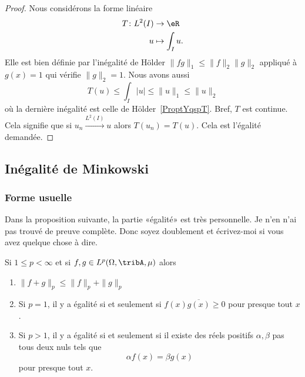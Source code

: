 \begin{proof}
	Nous considérons la forme linéaire
	\begin{equation}
		\begin{aligned}
			T\colon L^2(I) & \to \eR           \\
			u              & \mapsto \int_Iu .
		\end{aligned}
	\end{equation}
	Elle est bien définie par l'inégalité de Hölder \( \| fg \|_1\leq \| f \|_2\| g \|_2\) appliqué à \( g(x)=1\) qui vérifie \( \| g \|_2=1\). Nous avons aussi
	\begin{equation}
		T(u)\leq \int_I| u |\leq \| u \|_1\leq\| u \|_2
	\end{equation}
	où la dernière inégalité est celle de Hölder~\ref{ProptYqspT}. Bref, \( T\) est continue. Cela signifie que si \( u_n\stackrel{L^2(I)}{\longrightarrow}u\) alors \( T(u_n)=T(u)\). Cela est l'égalité demandée.
\end{proof}

\subsection{Inégalité de Minkowski}

\subsubsection{Forme usuelle}


\begin{probleme}
	Dans la proposition suivante, la partie «égalité» est très personnelle. Je n'en n'ai pas trouvé de preuve complète. Donc soyez doublement  et écrivez-moi si vous avez quelque chose à dire.
\end{probleme}

\begin{proposition}     \label{PropInegMinkKUpRHg}
	Si \( 1\leq p<\infty\) et si \( f,g\in L^p(\Omega,\tribA,\mu)\) alors
	\begin{enumerate}
		\item   \label{ItemDHukLJi}
		      \( \| f+g \|_p\leq \| f \|_p+\| g \|_p\)
		\item       \label{ITEMooGRXBooMLRMww}
		      Si \( p=1\), il y a égalité si et seulement si \( f(x)\overline{ g(x) }\geq 0\) pour presque tout \( x\).
		\item       \label{ITEMooQCSHooNUDwtM}
		      Si \( p>1\), il y a égalité si et seulement si il existe des réels positifs \( \alpha,\beta\) pas tous deux nuls tels que
		      \begin{equation}
			      \alpha f(x)=\beta g(x)
		      \end{equation}
		      pour presque tout \( x\).
	\end{enumerate}
\end{proposition}


